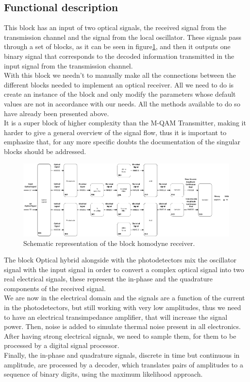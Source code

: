 \subsection*{Functional description}

This block has an input of two optical signals, the received signal from the transmission channel and the signal from the local oscillator. These signals pass through a set of blocks, as it can be seen in figure\ref{fig:homodyneRx_blocks}, and then it outputs one binary signal that corresponds to the decoded information transmitted in the input signal from the transmission channel. \\
With this block we needn't to manually make all the connections between the different blocks needed to implement an optical receiver. All we need to do is create an instance of the block and only modify the parameters whose default values are not in accordance with our needs. All the methods available to do so have already been presented above.\\
It is a super block of higher complexity than the M-QAM Transmitter, making it harder to give a general overview of the signal flow, thus it is important to emphasize that, for any more specific doubts the documentation of the singular blocks should be addressed.
\begin{figure}[H]
	\centering \includegraphics[width=\textwidth]{../lib/m_qam_receiver/figures/simulation_rx.pdf}
	\caption{Schematic representation of the block homodyne
	receiver.}\label{fig:homodyneRx_blocks}
\end{figure}
The block Optical hybrid alongside with the photodetectors mix the oscillator signal with the input signal in order to convert a complex optical signal into two real electrical signals, these represent the in-phase and the quadrature components of the received signal.\\
We are now in the electrical domain and the signals are a function of the current in the photodetectors, but still working with very low amplitudes, thus we need to have an electrical transimpedance amplifier, that will increase the signal power. Then, noise is added to simulate thermal noise present in all electronics.\\
After having strong electrical signals, we need to sample them, for them to be processed by a digital signal processor.\\
Finally, the in-phase and quadrature signals, discrete in time but continuous in amplitude, are processed by a decoder, which translates pairs of amplitudes to a sequence of binary digits, using the maximum likelihood approach.


